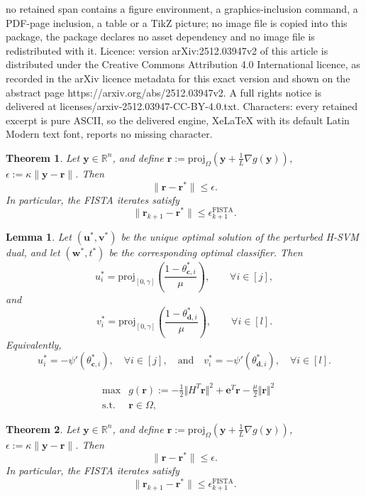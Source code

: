 \documentclass[10pt,a4paper]{amsart}
\newtheorem{lemma}{Lemma}
\newtheorem{theorem}{Theorem}
\newcommand\e{\bm{e}}
\newcommand\proj{\mathrm{proj}}
\newcommand\w{\bm{w}}
\newcommand\y{\bm{y}}
\renewcommand\r{\bm{r}}
\renewcommand\u{\bm{u}}
\renewcommand\v{\bm{v}}
\renewcommand{\c}{\bm{c}}
\renewcommand{\d}{\bm{d}}
\begin{document}
no retained span contains a figure environment, a graphics-inclusion command, a PDF-page inclusion, a table or a TikZ picture; no image file is copied into this package, the package declares no asset dependency and no image file is redistributed with it. Licence: version arXiv:2512.03947v2 of this article is distributed under the Creative Commons Attribution 4.0 International licence, as recorded in the arXiv licence metadata for this exact version and shown on the abstract page https://arxiv.org/abs/2512.03947v2. A full rights notice is delivered at licenses/arxiv-2512.03947-CC-BY-4.0.txt. Characters: every retained excerpt is pure ASCII, so the delivered engine, XeLaTeX with its default Latin Modern text font, reports no missing character.
\begin{theorem}
\label{thm:dist-to-opt-dual}
Let $\y\in\mathbb{R}^n$, and define $\r := \proj_{\Omega}(\y + \frac{1}{L}\nabla g(\y))$, $\epsilon := \kappa \|\y - \r\|$.
Then
\[
    \|\r-\r^*\|\leq\epsilon.
\]
In particular, the FISTA iterates satisfy
\[
    \|\r_{k+1} - \r^*\| \leq \epsilon_{k+1}^{\mathrm{FISTA}}.
\]
\end{theorem}

\begin{lemma} \label{lem:dual-psi-relation}
    Let $(\u^*,\v^*)$ be the unique optimal solution of the perturbed H-SVM dual, and let $(\w^*,t^*)$ be the corresponding optimal classifier. Then
    \[
        u_i^* = \proj_{[0,\gamma]}\left(\frac{1-\theta^*_{\c,i}}{\mu}\right),\qquad \forall i\in[j],
    \]
    and
    \[
        v_i^* = \proj_{[0,\gamma]}\left(\frac{1-\theta^*_{\d,i}}{\mu}\right),\qquad \forall i\in[l].
    \]
    Equivalently,
    \[
        u_i^* = -\psi'(\theta^*_{\c,i}),\quad\forall i \in [j],\quad\text{and}\quad v_i^* = -\psi'(\theta^*_{\d,i}),\quad\forall i \in [l].
    \]
\end{lemma}

\begin{equation} \label{prob:sm-svm-dual-p}
  \begin{array}{rrl}
    &\max&g(\r):=-\frac{1}{2}\Vert H^T\r\Vert^2 + \e^T\r - \frac{\mu}{2}\Vert\r\Vert^2\\
    &\mbox{s.t.}&\r\in \Omega,
  \end{array}
\end{equation}

\begin{theorem} \label{thm:Csvm-dist-to-opt-dual}
Let $\y\in\mathbb{R}^n$, and define $\r := \proj_{\Omega}(\y + \frac{1}{L}\nabla g(\y))$, $\epsilon := \kappa \|\y - \r\|$.
Then
\[
    \|\r-\r^*\|\leq\epsilon.
\]
In particular, the FISTA iterates satisfy
\[
    \|\r_{k+1} - \r^*\| \leq \epsilon_{k+1}^{\mathrm{FISTA}}.
\]
\end{theorem}
\end{document}
